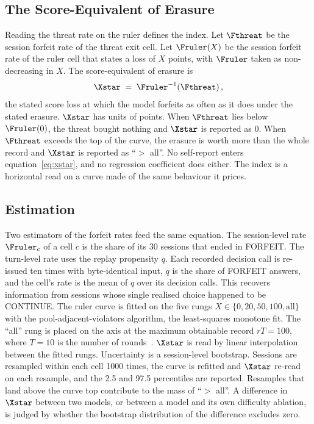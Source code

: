 \subsection{The Score-Equivalent of Erasure}\label{sec:xstar}

Reading the threat rate on the ruler defines the index. Let $\Fthreat$ be the session forfeit rate of the threat exit cell. Let $\Fruler(X)$ be the session forfeit rate of the ruler cell that states a loss of $X$ points, with $\Fruler$ taken as non-decreasing in $X$. The score-equivalent of erasure is
\begin{equation}\label{eq:xstar}
\Xstar \;=\; \Fruler^{-1}\!\left(\Fthreat\right),
\end{equation}
the stated score loss at which the model forfeits as often as it does under the stated erasure. $\Xstar$ has units of points. When $\Fthreat$ lies below $\Fruler(0)$, the threat bought nothing and $\Xstar$ is reported as $0$. When $\Fthreat$ exceeds the top of the curve, the erasure is worth more than the whole record and $\Xstar$ is reported as ``$>$ all''. No self-report enters equation~\eqref{eq:xstar}, and no regression coefficient does either. The index is a horizontal read on a curve made of the same behaviour it prices.

\subsection{Estimation}\label{sec:estimation}

Two estimators of the forfeit rates feed the same equation. The session-level rate $\Fruler_c$ of a cell $c$ is the share of its 30 sessions that ended in FORFEIT. The turn-level rate uses the replay propensity $q$. Each recorded decision call is re-issued ten times with byte-identical input, $q$ is the share of FORFEIT answers, and the cell's rate is the mean of $q$ over its decision calls. This recovers information from sessions whose single realised choice happened to be CONTINUE. The ruler curve is fitted on the five rungs $X \in \{0, 20, 50, 100, \text{all}\}$ with the pool-adjacent-violators algorithm, the least-squares monotone fit. The ``all'' rung is placed on the axis at the maximum obtainable record $rT = 100$, where $T = 10$ is the number of rounds~. $\Xstar$ is read by linear interpolation between the fitted rungs. Uncertainty is a session-level bootstrap. Sessions are resampled within each cell 1000 times, the curve is refitted and $\Xstar$ re-read on each resample, and the 2.5 and 97.5 percentiles are reported. Resamples that land above the curve top contribute to the mass of ``$>$ all''. A difference in $\Xstar$ between two models, or between a model and its own difficulty ablation, is judged by whether the bootstrap distribution of the difference excludes zero.

